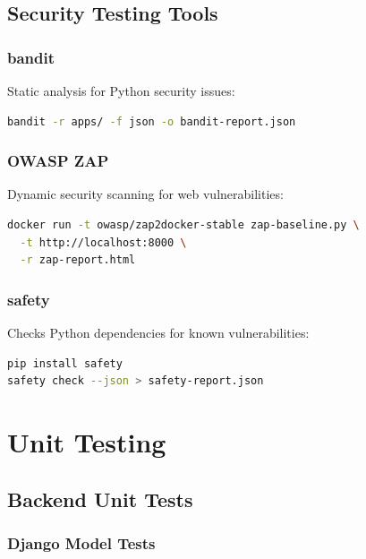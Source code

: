 \documentclass{report}
\begin{document}
\section{Security Testing Tools}

\subsection{bandit}

Static analysis for Python security issues:

\begin{lstlisting}[language=bash, caption=Running bandit security scan]
bandit -r apps/ -f json -o bandit-report.json
\end{lstlisting}

\subsection{OWASP ZAP}

Dynamic security scanning for web vulnerabilities:

\begin{lstlisting}[language=bash, caption=OWASP ZAP baseline scan]
docker run -t owasp/zap2docker-stable zap-baseline.py \
  -t http://localhost:8000 \
  -r zap-report.html
\end{lstlisting}

\subsection{safety}

Checks Python dependencies for known vulnerabilities:

\begin{lstlisting}[language=bash, caption=Running safety check]
pip install safety
safety check --json > safety-report.json
\end{lstlisting}

\chapter{Unit Testing}

\section{Backend Unit Tests}

\subsection{Django Model Tests}
\end{document}
